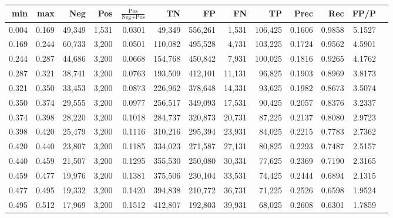 \begin{tabular}{rrrrrrrrrrrrr}
\toprule
  min &   max &    Neg &   Pos & $\frac{\text{Pos}}{\text{Neg}+\text{Pos}}$ &      TN &      FP &      FN &      TP &   Prec &    Rec &   FP/P \\
\midrule
0.004 & 0.169 & 49,349 & 1,531 &                                     0.0301 &  49,349 & 556,261 &   1,531 & 106,425 & 0.1606 & 0.9858 & 5.1527 \\
0.169 & 0.244 & 60,733 & 3,200 &                                     0.0501 & 110,082 & 495,528 &   4,731 & 103,225 & 0.1724 & 0.9562 & 4.5901 \\
0.244 & 0.287 & 44,686 & 3,200 &                                     0.0668 & 154,768 & 450,842 &   7,931 & 100,025 & 0.1816 & 0.9265 & 4.1762 \\
0.287 & 0.321 & 38,741 & 3,200 &                                     0.0763 & 193,509 & 412,101 &  11,131 &  96,825 & 0.1903 & 0.8969 & 3.8173 \\
0.321 & 0.350 & 33,453 & 3,200 &                                     0.0873 & 226,962 & 378,648 &  14,331 &  93,625 & 0.1982 & 0.8673 & 3.5074 \\
0.350 & 0.374 & 29,555 & 3,200 &                                     0.0977 & 256,517 & 349,093 &  17,531 &  90,425 & 0.2057 & 0.8376 & 3.2337 \\
0.374 & 0.398 & 28,220 & 3,200 &                                     0.1018 & 284,737 & 320,873 &  20,731 &  87,225 & 0.2137 & 0.8080 & 2.9723 \\
0.398 & 0.420 & 25,479 & 3,200 &                                     0.1116 & 310,216 & 295,394 &  23,931 &  84,025 & 0.2215 & 0.7783 & 2.7362 \\
0.420 & 0.440 & 23,807 & 3,200 &                                     0.1185 & 334,023 & 271,587 &  27,131 &  80,825 & 0.2293 & 0.7487 & 2.5157 \\
0.440 & 0.459 & 21,507 & 3,200 &                                     0.1295 & 355,530 & 250,080 &  30,331 &  77,625 & 0.2369 & 0.7190 & 2.3165 \\
0.459 & 0.477 & 19,976 & 3,200 &                                     0.1381 & 375,506 & 230,104 &  33,531 &  74,425 & 0.2444 & 0.6894 & 2.1315 \\
0.477 & 0.495 & 19,332 & 3,200 &                                     0.1420 & 394,838 & 210,772 &  36,731 &  71,225 & 0.2526 & 0.6598 & 1.9524 \\
0.495 & 0.512 & 17,969 & 3,200 &                                     0.1512 & 412,807 & 192,803 &  39,931 &  68,025 & 0.2608 & 0.6301 & 1.7859 \\

\end{tabular}
